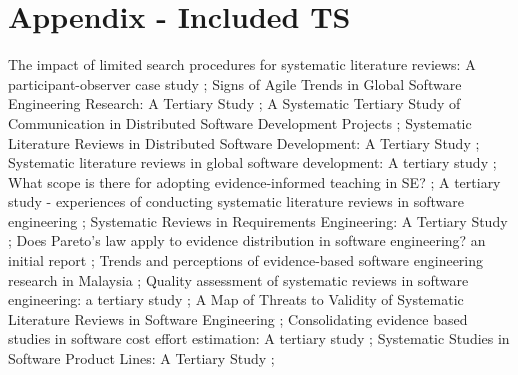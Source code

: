 \documentclass[sigconf]{acmart}
\begin{document}
\section{Appendix - Included TS}
{\small
\noindent [S2009-015] The impact of limited search procedures for systematic literature reviews: A participant-observer case study \cite{Kitchenham2009b};\newline
\noindent  [C2011-006] Signs of Agile Trends in Global Software Engineering Research: A Tertiary Study  \cite{BARROSJUSTO2018};\newline
\noindent  [C2012-004] A Systematic Tertiary Study of Communication in Distributed Software Development Projects \cite{Santos2012};\newline
\noindent  [C2012-009] Systematic Literature Reviews in Distributed Software Development: A Tertiary Study  \cite{Marques2021};\newline
\noindent [C2012-010] Systematic literature reviews in global software development: A tertiary study \cite{Verner2012};\newline
\noindent [C2012-030] What scope is there for adopting evidence-informed teaching in SE? \cite{Budgen012};\newline
\noindent [C2013-032] A tertiary study - experiences of conducting systematic literature reviews in software engineering \cite{Imtiaz2013};\newline
\noindent [C2014-001] Systematic Reviews in Requirements Engineering: A Tertiary Study  \cite{Bano2014};\newline
\noindent [W2014-026] Does Pareto's law apply to evidence distribution in software engineering? an initial report \cite{Tang2014};\newline
\noindent [C2015-018] Trends and perceptions of evidence-based software engineering research in Malaysia \cite{Salleh2014};\newline
\noindent [C2015-022] Quality assessment of systematic reviews in software engineering: a tertiary study \cite{Zhou2015}; \newline
\noindent [C2016-011] A Map of Threats to Validity of Systematic Literature Reviews in Software Engineering \cite{Zhou2016}; \newline
\noindent [C2017-007] Consolidating evidence based studies in software cost effort estimation: A tertiary study \cite{Pillai2017};\newline
\noindent [C2017-020] Systematic Studies in Software Product Lines: A Tertiary Study \cite{Marimuthu2017};\newline
}
\end{document}
